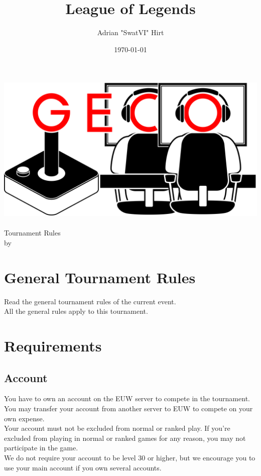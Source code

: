 \documentclass{article}
\title{League of Legends}
\author{Adrian "SwatVI" Hirt}
\date{\today}
\begin{document}
\makeatletter
\begin{titlepage}
\centering
\includegraphics[scale=0.075]{../img/GECo.png}\\
\LARGE \@title\\ Tournament Rules\\ \normalsize by \@author\\ \@date
\end{titlepage}
\makeatother


\clearpage

\tableofcontents
\clearpage

\section{General Tournament Rules}
Read the general tournament rules of the current event.\\
All the general rules apply to this tournament.

\section{Requirements}
\subsection{Account}
You have to own an account on the EUW server to compete in the tournament. You may transfer your account from another server to EUW to compete on your own expense.
\\
Your account must not be excluded from normal or ranked play. If you're excluded from playing in normal or ranked games for any reason, you may not participate in the game.
\\
We do not require your account to be level 30 or higher, but we encourage you to use your main account if you own several accounts.
\end{document}
